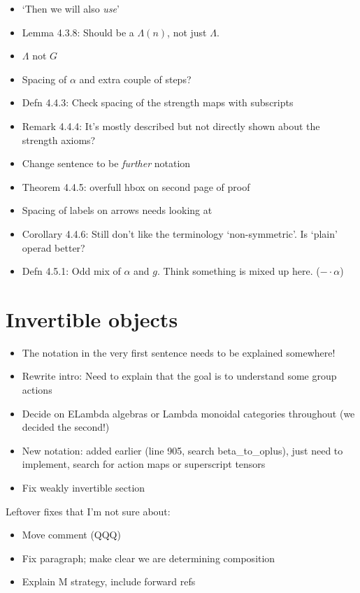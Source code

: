 \documentclass{amsart}
\begin{document}
\begin{itemize}
\item `Then we will also \textit{use}'
\item Lemma 4.3.8: Should be a $\Lambda(n)$, not just $\Lambda$.
\item $\Lambda$ not $G$
\item Spacing of $\alpha$ and extra couple of steps?
\item Defn 4.4.3: Check spacing of the strength maps with subscripts
\item Remark 4.4.4: It's mostly described but not directly shown about the strength axioms?
\item Change sentence to be \textit{further} notation
\item Theorem 4.4.5: overfull hbox on second page of proof
\item Spacing of labels on arrows needs looking at
\item Corollary 4.4.6: Still don't like the terminology `non-symmetric'. Is `plain' operad better?
\item Defn 4.5.1: Odd mix of $\alpha$ and $g$. Think something is mixed up here. ($- \cdot \alpha$)
\end{itemize}



\section{ Invertible objects}

\begin{itemize}
\item The notation in the very first sentence needs to be explained somewhere!
\item Rewrite intro: Need to explain that the goal is to understand some group actions
\item Decide on ELambda algebras or Lambda monoidal categories throughout (we decided the second!)
\item New notation: added earlier (line 905, search beta\_to\_oplus), just need to implement, search for action maps or superscript tensors
\item Fix weakly invertible section
\end{itemize}

Leftover fixes that I'm not sure about:
\begin{itemize}
\item Move comment (QQQ)
\item Fix paragraph; make clear we are determining composition
\item Explain M strategy, include forward refs
\end{itemize}
\end{document}
